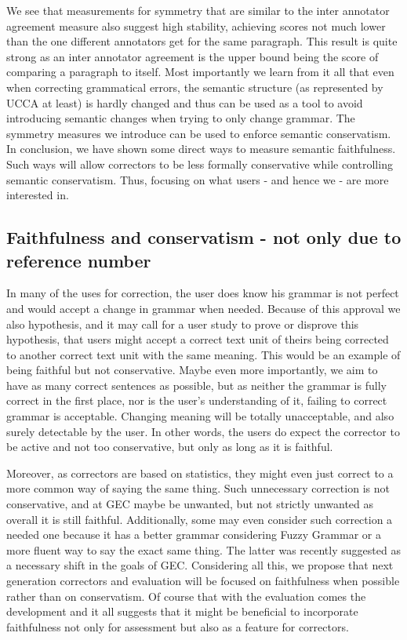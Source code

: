 \documentclass[letter,11pt]{article}
\begin{document}
	We see that measurements for symmetry that are similar to the inter
	annotator agreement measure also suggest high stability, achieving
	scores not much lower than the one different annotators get for the
	same paragraph. This result is quite strong as an inter annotator
	agreement is the upper bound being the score of comparing a paragraph to itself. 
	Most importantly we learn from it all that even when correcting grammatical errors, the semantic structure (as represented by UCCA at least) is hardly changed and thus can be used as a tool to avoid introducing semantic changes when trying to only change grammar. 
	The symmetry measures we introduce can be used to enforce semantic conservatism.
	In conclusion, we have shown some direct ways to measure
	semantic faithfulness. Such ways will allow correctors to be less formally conservative while controlling semantic conservatism. Thus, focusing on what users - and hence we - are more interested in.
	\subsection{Faithfulness and conservatism - not only due to reference number}
	In many of the uses for correction,
		the user does know his grammar is not perfect and would accept
		a change in grammar when needed. Because of this approval we also
		hypothesis, and it may call for a user study to prove or disprove
		this hypothesis, that users might accept a correct text unit of theirs
		being corrected to another correct text unit with the same meaning.
		This would be an example of being faithful but not conservative.
		Maybe even more importantly, we aim to have as many correct sentences
		as possible, but as neither the grammar is fully correct in the first place,
		nor is the user's understanding of it, failing to correct grammar
		is acceptable. Changing meaning will be totally unacceptable, and
		also surely detectable by the user. In other words, the users do expect
		the corrector to be active and not too conservative, but
		only as long as it is faithful. 
		
		Moreover, as correctors are based on statistics, they might even
		just correct to a more common way of saying the same thing. Such unnecessary
		correction is not conservative, and at GEC maybe be unwanted, but not strictly unwanted as overall
		it is still faithful. Additionally, some may even
		consider such correction a needed one because it has a better grammar considering
		Fuzzy Grammar\cite{lakoff1973fuzzy,madnani2011they} or a more fluent
		way to say the exact same thing. The latter was recently suggested as a necessary
		shift in the goals of GEC\cite{sakaguchi2016reassessing}.
		Considering all this, we propose that next generation correctors and evaluation will be focused on faithfulness
		when possible rather than on conservatism. Of course that with the evaluation comes the development and it all suggests that it might be beneficial to incorporate faithfulness not only for assessment but also as a feature for correctors. 
\end{document}
